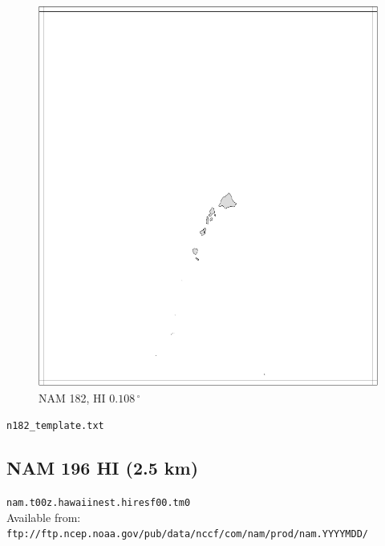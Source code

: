 \documentclass[11pt]{article}   %
\begin{document}
\begin{figure}[htbp]\begin{center}
 \includegraphics[angle=-90,scale=0.9]{Figs/n182.pdf}
\parbox{15cm}{\caption{\label{FigNAM182}
NAM 182, HI $0.108  \, ^{\circ}$
}}
\end{center}\end{figure}
\clearpage
\verb|n182_template.txt| \\
\tiny  \normalsize


\clearpage
\subsection{NAM 196 HI (2.5 km)}

\verb|nam.t00z.hawaiinest.hiresf00.tm0|\\
Available from:\\
\verb|ftp://ftp.ncep.noaa.gov/pub/data/nccf/com/nam/prod/nam.YYYYMDD/|
\end{document}
